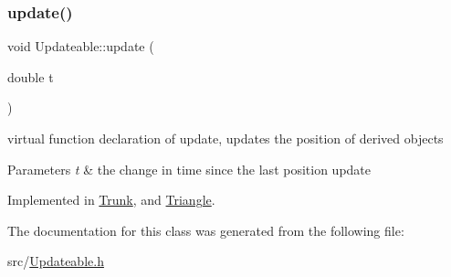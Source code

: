 \subsubsection{\texorpdfstring{update()}{update()}}
{\footnotesize\ttfamily void Updateable\+::update (\begin{DoxyParamCaption}\item[{double}]{t }\end{DoxyParamCaption})\hspace{0.3cm}{\ttfamily [pure virtual]}}



virtual function declaration of update, updates the position of derived objects 


\begin{DoxyParams}{Parameters}
{\em t} & the change in time since the last position update \\
\hline
\end{DoxyParams}


Implemented in \mbox{\hyperlink{class_trunk_ab62c99b7a3ad20b53d81b87afa91d28d}{Trunk}}, and \mbox{\hyperlink{class_triangle_a38658aaef09315379d75dd9a36456c0e}{Triangle}}.



The documentation for this class was generated from the following file\+:\begin{DoxyCompactItemize}
\item 
src/\mbox{\hyperlink{_updateable_8h}{Updateable.\+h}}\end{DoxyCompactItemize}
